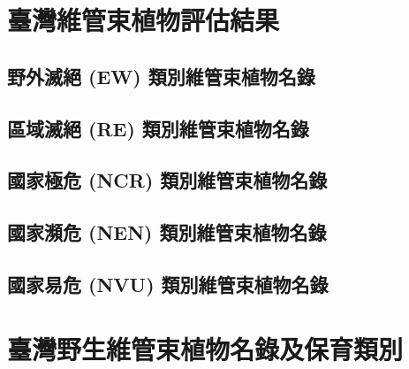 \chapter{臺灣維管束植物評估結果}


\section{野外滅絕 (EW) 類別維管束植物名錄}

\section{區域滅絕 (RE) 類別維管束植物名錄}

\section{國家極危 (NCR) 類別維管束植物名錄}

\section{國家瀕危 (NEN) 類別維管束植物名錄}

\section{國家易危 (NVU) 類別維管束植物名錄}


\chapter{臺灣野生維管束植物名錄及保育類別}

